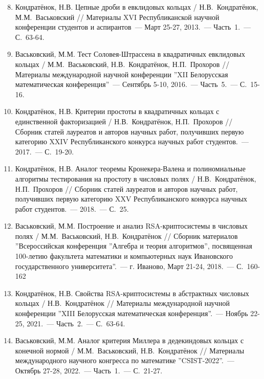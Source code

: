 \documentclass[_00_dissertation.tex]{subfiles}
\begin{document}
\begin{enumerate}
\setcounter{enumi}{7}

    \item \label{source:Republican_Scientific_Conference_of_Students_and_Postgraduates_2013}
    Кондратёнок, Н.В. Цепные дроби в евклидовых кольцах / Н.В.~Кондратёнок, М.М.~Васьковский // Материалы XVI Республиканской научной конференции студентов и аспирантов~--- Март 25-27, 2013.~--- Часть~1.~--- С.~63-64.

    \item \label{source:XII_Belarussian_math_conference_2016}
    Васьковский, М.М. Тест Соловея-Штрассена в квадратичных евклидовых кольцах / М.М.~Васьковский, Н.В.~Кондратёнок, Н.П.~Прохоров // Материалы международной научной конференции ''XII Белорусская математическая конференция''~--- Сентябрь 5-10, 2016.~--- Часть~5.~--- С.~15-16.

    \item \label{source:Collection_of_articles_by_laureates_2017}
    Кондратёнок, Н.В. Критерии простоты в квадратичных кольцах с единственной факторизацией / Н.В.~Кондратёнок, Н.П.~Прохоров // Сборник статей лауреатов и авторов научных работ, получивших первую категорию XXIV Республиканского конкурса научных работ студентов.~--- 2017.~--- С.~19-20.

    \item \label{source:Collection_of_articles_by_laureates_2018}
    Кондратёнок, Н.В. Аналог теоремы Кронекера-Валена и полиномиальные алгоритмы тестирования на простоту в числовых полях / Н.В.~Кондратёнок, Н.П.~Прохоров // Сборник статей лауреатов и авторов научных работ, получивших первую категорию XXV Республиканского конкурса научных работ студентов.~--- 2018.~--- С.~25.

    \item \label{source:Algebra_and_theory_of_algorithms}
    Васьковский, М.М. Построение и анализ RSA-криптосистемы в числовых полях / М.М.~Васьковский, Н.В.~Кондратёнок // Сборник материалов ''Всероссийская конференция ''Алгебра и теория алгоритмов'', посвященная 100-летию факультета математики и компьютерных наук Ивановского государственного университета''.~--- г. Иваново, Март 21-24, 2018.~--- С.~160-162

    \item \label{source:XIII_Belarussian_math_conference_2021}
    Кондратёнок, Н.В. Свойства RSA-криптосистемы в абстрактных числовых кольцах / Н.В.~Кондратёнок // Материалы международной научной конференции ''XIII Белорусская математическая конференция''.~--- Ноябрь 22-25, 2021.~--- Часть~2.~--- С.~63-64.

    \item \label{source:CSIST_2022}
    Васьковский, М.М. Аналог критерия Миллера в дедекиндовых кольцах с конечной нормой / М.М.~Васьковский, Н.В.~Кондратёнок // Материалы международного научного конгресса по математике ''CSIST-2022''.~--- Октябрь 27-28, 2022.~--- Часть~1.~--- С.~21-27.

\end{enumerate}

\end{document}
